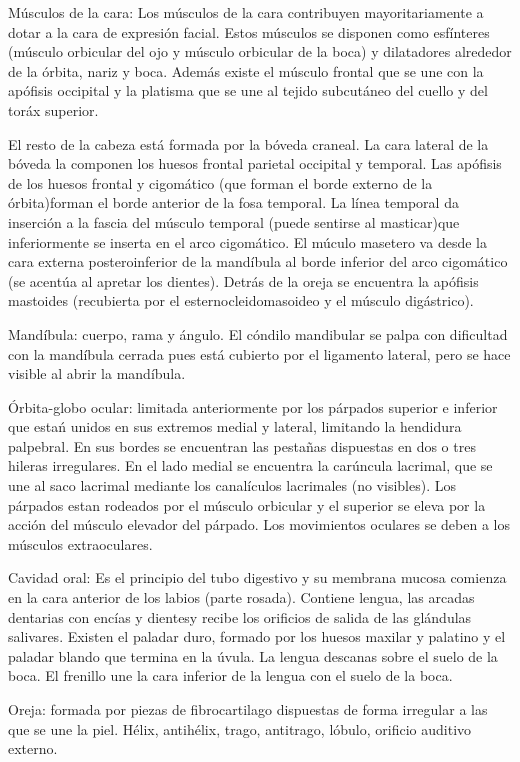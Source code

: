 Músculos de la cara: Los músculos de la cara contribuyen mayoritariamente a dotar a la cara de expresión facial. Estos músculos se disponen como esfínteres (músculo orbicular del ojo y músculo orbicular de la boca) y dilatadores alrededor de la órbita, nariz y boca. Además existe el músculo frontal que se une con la apófisis occipital y la platisma que se une al tejido subcutáneo del cuello y del toráx superior.

El resto de la cabeza está formada por la bóveda craneal. La cara lateral de la bóveda la componen los huesos frontal parietal occipital y temporal.
Las apófisis de los huesos frontal y cigomático (que forman el borde externo de la órbita)forman el borde anterior de la fosa temporal. La línea temporal da inserción a la fascia del músculo temporal  (puede sentirse al masticar)que inferiormente se inserta en el arco cigomático.
El múculo masetero va desde la cara externa posteroinferior de la mandíbula al borde inferior del arco cigomático (se acentúa al apretar los dientes).
Detrás de la oreja se encuentra la apófisis mastoides (recubierta por el esternocleidomasoideo y el músculo digástrico).

Mandíbula: cuerpo, rama y ángulo. El cóndilo mandibular se palpa con dificultad con la mandíbula cerrada pues está cubierto por el ligamento lateral, pero se hace visible al abrir la mandíbula.

Órbita-globo ocular: limitada anteriormente por los párpados superior e inferior que estań unidos en sus extremos medial y lateral, limitando la hendidura palpebral. En sus bordes se encuentran las pestañas dispuestas en dos o tres hileras irregulares. En el lado medial se encuentra la carúncula lacrimal, que se une al saco lacrimal mediante los canalículos lacrimales (no visibles). Los párpados estan rodeados por el músculo orbicular y el superior se eleva por la acción del músculo elevador del párpado. Los movimientos oculares se deben a los músculos extraoculares.

Cavidad oral: Es el principio del tubo digestivo y su membrana mucosa comienza en la cara anterior de los labios (parte rosada). Contiene lengua, las arcadas dentarias con encías y dientesy recibe los orificios de salida de las glándulas salivares. Existen el paladar duro, formado por los huesos maxilar y palatino y el paladar blando que termina en la úvula. La lengua descanas sobre el suelo de la boca. El frenillo une la cara inferior de la lengua con el suelo de la boca.

Oreja: formada por piezas de fibrocartilago dispuestas de forma irregular a las que se une la piel. Hélix, antihélix, trago, antitrago, lóbulo, orificio auditivo externo.


